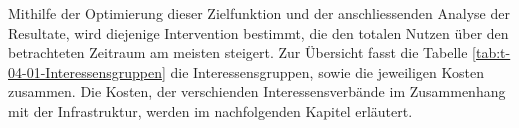 Mithilfe der Optimierung dieser Zielfunktion und der anschliessenden Analyse der Resultate, wird diejenige Intervention bestimmt, die den totalen Nutzen über den betrachteten Zeitraum am meisten steigert. 
Zur Übersicht fasst die Tabelle \ref{tab:t-04-01-Interessensgruppen} die Interessensgruppen, sowie die jeweiligen Kosten zusammen. Die Kosten, der verschienden Interessensverbände im Zusammenhang mit der Infrastruktur, werden im nachfolgenden Kapitel erläutert.



\pagebreak

%

